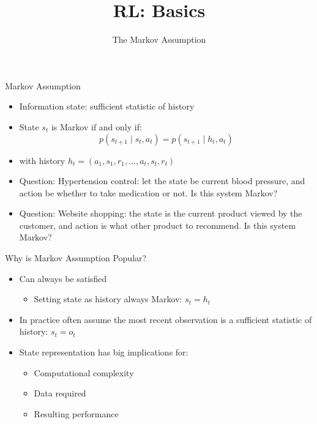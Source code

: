 \documentclass[aspectratio=169]{../latex_main/tntbeamer}  %
\title[Reinforcement Learning: Basics]{RL: Basics}
\subtitle{The Markov Assumption}
\begin{document}
	
	\maketitle

\begin{frame}[c]{Markov Assumption}

\begin{itemize}
	\item Information state: sufficient statistic of history
	\item State $s_t$ is Markov if and only if:
	$$ p(s_{t+1} \mid s_t, a_t) = p(s_{t+1} \mid h_t, a_t)$$
	\item with history $h_t = (a_1, s_1, r_1, \ldots, a_t, s_t, r_t)$
	\pause
	\medskip
	\item \alert{Question:} Hypertension control: let the state be current blood pressure, and action be whether to take medication or not. Is this system Markov?
	\item \alert{Question:} Website shopping: the state is the current product viewed by the customer, and action is what other product to recommend. Is this system Markov?
\end{itemize}

\end{frame}
\begin{frame}[c]{Why is Markov Assumption Popular?}
	
	\begin{itemize}
		\item Can always be satisfied
		\begin{itemize}
			\item Setting state as history always Markov: $s_t = h_t$
		\end{itemize}
		\item In practice often assume the most recent observation is a sufficient statistic
		of history: $s_t = o_t$
		\item State representation has big implications for:
		\begin{itemize}
			\item Computational complexity
			\item Data required
			\item Resulting performance
		\end{itemize}
	\end{itemize}
	
\end{frame}
\end{document}
